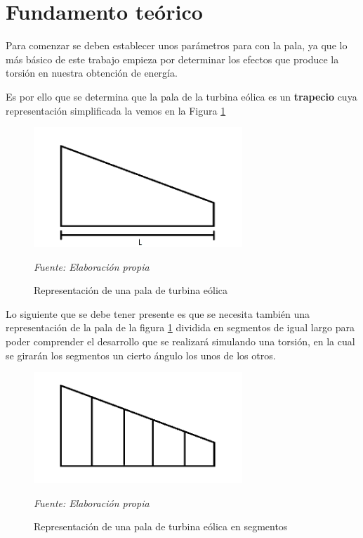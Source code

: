\section{Fundamento teórico}

Para comenzar se deben establecer unos parámetros para con la pala, ya que lo más básico de este trabajo empieza por determinar los efectos que produce la torsión en nuestra obtención de energía.

Es por ello que se determina que la pala de la turbina eólica es un \textbf{trapecio} cuya representación simplificada la vemos en la Figura \ref{fig:pala_simp}

\begin{figure}[H]
    \centering
    \includegraphics[width=0.7\textwidth]{images/pala turbina paint.png}
    \caption{Representación de una pala de turbina eólica}
    \textit{Fuente: Elaboración propia}
    \label{fig:pala_simp}
\end{figure}


Lo siguiente que se debe tener presente es que se necesita también una representación de la pala de la figura \ref{fig:pala_simp} dividida en segmentos de igual largo para poder comprender el desarrollo que se realizará simulando una torsión, en la cual se girarán los segmentos un cierto ángulo los unos de los otros.

    \textbf{}
    \begin{figure}[H]
    \centering
    \includegraphics[width=0.7\textwidth]{images/pala dividida.png}
    \caption{Representación de una pala de turbina eólica en segmentos}
    \textit{Fuente: Elaboración propia}
    \label{fig:pala_dividida}
\end{figure}

